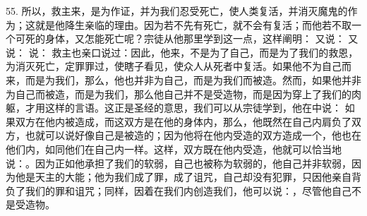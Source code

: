 55. 所以，救主来，是为作证，并为我们忍受死亡，使人类复活，并消灭魔鬼的作为；这就是他降生亲临的理由。因为若不先有死亡，就不会有复活；而他若不取一个可死的身体，又怎能死亡呢？宗徒从他那里学到这一点，这样阐明： 又说： 又说： 说： 救主也亲口说过：因此，他来，不是为了自己，而是为了我们的救恩，为消灭死亡，定罪罪过，使瞎子看见，使众人从死者中复活。如果他不为自己而来，而是为我们，那么，他也并非为自己，而是为我们而被造。然而，如果他并非为自己而被造，而是为我们，那么他自己并不是受造物，而是因为穿上了我们的肉躯，才用这样的言语。这正是圣经的意思，我们可以从宗徒学到，他在中说： 如果双方在他内被造成，而这双方是在他的身体内，那么，他既然在自己内肩负了双方，也就可以说好像自己是被造的；因为他将在他内受造的双方造成一个，他也在他们内，如同他们在自己内一样。这样，双方既在他内受造，他就可以恰当地说：。因为正如他承担了我们的软弱，自己也被称为软弱的，他自己并非软弱，因为他是天主的大能；他为我们成了罪，成了诅咒，自己却没有犯罪，只因他亲自背负了我们的罪和诅咒；同样，因着在我们内创造我们，他可以说：，尽管他自己不是受造物。\par

